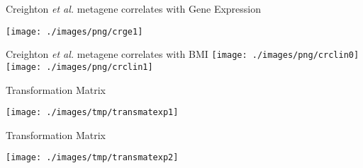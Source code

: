 \documentclass[handout]{beamer}
\begin{document}
\begin{frame}{\normalsize Creighton \textit{et al.} metagene correlates with Gene Expression}
	\begin{center}
		\texttt{[image: ./images/png/crge1]}
	\end{center}
\end{frame}

\begin{frame}{Creighton \textit{et al.} metagene correlates with BMI}
	\texttt{[image: ./images/png/crclin0]}
	\texttt{[image: ./images/png/crclin1]}
\end{frame}


\begin{frame}{Transformation Matrix}
	\begin{center}
		\texttt{[image: ./images/tmp/transmatexp1]}
	\end{center}
\end{frame}

\begin{frame}{Transformation Matrix}
	\begin{center}
		\texttt{[image: ./images/tmp/transmatexp2]}
	\end{center}
\end{frame}
\end{document}
